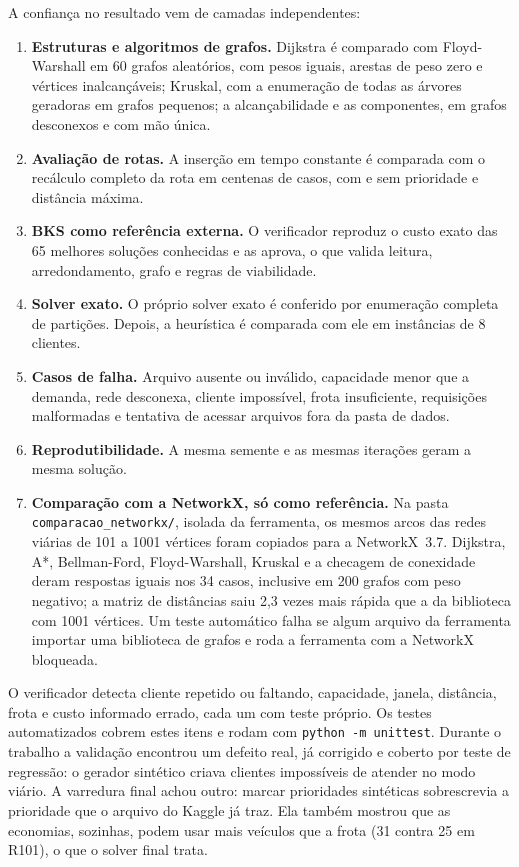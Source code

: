 \documentclass[12pt]{article}
\begin{document}
A confiança no resultado vem de camadas independentes:
\begin{enumerate}
  \item \textbf{Estruturas e algoritmos de grafos.} Dijkstra é comparado com Floyd-Warshall em 60 grafos aleatórios, com pesos iguais, arestas de peso zero e vértices inalcançáveis; Kruskal, com a enumeração de todas as árvores geradoras em grafos pequenos; a alcançabilidade e as componentes, em grafos desconexos e com mão única.
  \item \textbf{Avaliação de rotas.} A inserção em tempo constante é comparada com o recálculo completo da rota em centenas de casos, com e sem prioridade e distância máxima.
  \item \textbf{BKS como referência externa.} O verificador reproduz o custo exato das 65 melhores soluções conhecidas e as aprova, o que valida leitura, arredondamento, grafo e regras de viabilidade.
  \item \textbf{Solver exato.} O próprio solver exato é conferido por enumeração completa de partições. Depois, a heurística é comparada com ele em \exN{} instâncias de 8 clientes.
  \item \textbf{Casos de falha.} Arquivo ausente ou inválido, capacidade menor que a demanda, rede desconexa, cliente impossível, frota insuficiente, requisições malformadas e tentativa de acessar arquivos fora da pasta de dados.
  \item \textbf{Reprodutibilidade.} A mesma semente e as mesmas iterações geram a mesma solução.
  \item \textbf{Comparação com a NetworkX, só como referência.} Na pasta \texttt{comparacao\_networkx/}, isolada da ferramenta, os mesmos arcos das redes viárias de 101 a 1001 vértices foram copiados para a NetworkX~3.7. Dijkstra, A*, Bellman-Ford, Floyd-Warshall, Kruskal e a checagem de conexidade deram respostas iguais nos 34 casos, inclusive em 200 grafos com peso negativo; a matriz de distâncias saiu 2,3 vezes mais rápida que a da biblioteca com 1001 vértices. Um teste automático falha se algum arquivo da ferramenta importar uma biblioteca de grafos e roda a ferramenta com a NetworkX bloqueada.
\end{enumerate}
O verificador detecta cliente repetido ou faltando, capacidade, janela, distância, frota e custo informado errado, cada um com teste próprio. Os testes automatizados cobrem estes itens e rodam com \texttt{python -m unittest}. Durante o trabalho a validação encontrou um defeito real, já corrigido e coberto por teste de regressão: o gerador sintético criava clientes impossíveis de atender no modo viário. A varredura final achou outro: marcar prioridades sintéticas sobrescrevia a prioridade que o arquivo do Kaggle já traz. Ela também mostrou que as economias, sozinhas, podem usar mais veículos que a frota (31 contra 25 em R101), o que o solver final trata.
\end{document}
